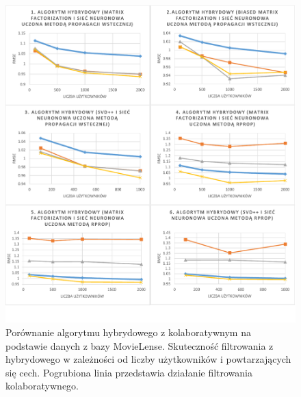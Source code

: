 \documentclass[twoside]{iisthesis}
\begin{document}
\begin{figure}[!ht]
	\centering
	\includegraphics[page=2,width=1\textwidth]{exphybrid_movielens2}
	\caption{Porównanie algorytmu hybrydowego z kolaboratywnym na podstawie danych z bazy MovieLense. Skuteczność filtrowania z hybrydowego w zależności od liczby użytkowników i powtarzających się cech. Pogrubiona linia przedstawia działanie filtrowania kolaboratywnego.}
	\label{fig:exphybrid_movielens2b}
\end{figure}


\end{document}
